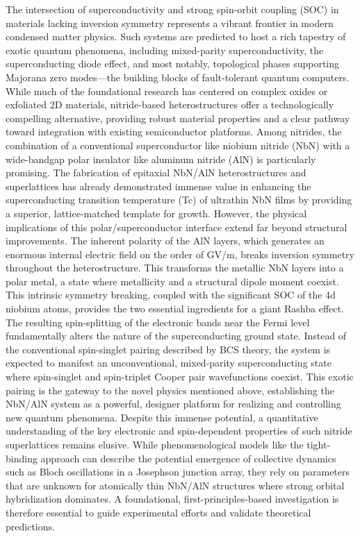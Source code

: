 \documentclass[aps,prl,reprint,superscriptaddress]{revtex4-2}
\begin{document}
The intersection of superconductivity and strong spin-orbit coupling (SOC) in materials lacking inversion symmetry represents a vibrant frontier in modern condensed matter physics. Such systems are predicted to host a rich tapestry of exotic quantum phenomena, including mixed-parity superconductivity, the superconducting diode effect, and most notably, topological phases supporting Majorana zero modes—the building blocks of fault-tolerant quantum computers. While much of the foundational research has centered on complex oxides or exfoliated 2D materials, nitride-based heterostructures offer a technologically compelling alternative, providing robust material properties and a clear pathway toward integration with existing semiconductor platforms.
Among nitrides, the combination of a conventional superconductor like niobium nitride (NbN) with a wide-bandgap polar insulator like aluminum nitride (AlN) is particularly promising. The fabrication of epitaxial NbN/AlN heterostructures and superlattices has already demonstrated immense value in enhancing the superconducting transition temperature (Tc) of ultrathin NbN films by providing a superior, lattice-matched template for growth. However, the physical implications of this polar/superconductor interface extend far beyond structural improvements. The inherent polarity of the AlN layers, which generates an enormous internal electric field on the order of GV/m, breaks inversion symmetry throughout the heterostructure. This transforms the metallic NbN layers into a polar metal, a state where metallicity and a structural dipole moment coexist.
This intrinsic symmetry breaking, coupled with the significant SOC of the 4d niobium atoms, provides the two essential ingredients for a giant Rashba effect. The resulting spin-splitting of the electronic bands near the Fermi level fundamentally alters the nature of the superconducting ground state. Instead of the conventional spin-singlet pairing described by BCS theory, the system is expected to manifest an unconventional, mixed-parity superconducting state where spin-singlet and spin-triplet Cooper pair wavefunctions coexist. This exotic pairing is the gateway to the novel physics mentioned above, establishing the NbN/AlN system as a powerful, designer platform for realizing and controlling new quantum phenomena.
Despite this immense potential, a quantitative understanding of the key electronic and spin-dependent properties of such nitride superlattices remains elusive. While phenomenological models like the tight-binding approach can describe the potential emergence of collective dynamics such as Bloch oscillations in a Josephson junction array, they rely on parameters that are unknown for atomically thin NbN/AlN structures where strong orbital hybridization dominates. A foundational, first-principles-based investigation is therefore essential to guide experimental efforts and validate theoretical predictions.
\end{document}
